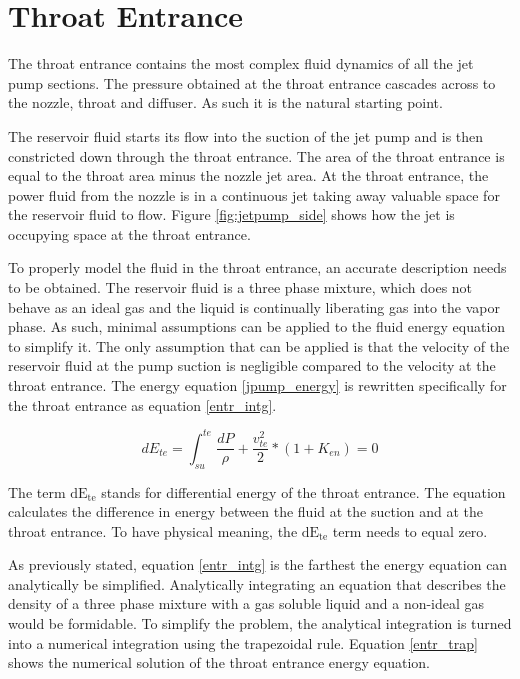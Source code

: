 \documentclass[12 pt]{report}
\newcommand{\dete}{$\mathrm{dE_{te}}$\xspace}  %
\begin{document}


\section{Throat Entrance}

The throat entrance contains the most complex fluid dynamics of all the jet pump sections. The pressure obtained at the throat entrance cascades across to the nozzle, throat and diffuser. As such it is the natural starting point.

The reservoir fluid starts its flow into the suction of the jet pump and is then constricted down through the throat entrance. The area of the throat entrance is equal to the throat area minus the nozzle jet area. At the throat entrance, the power fluid from the nozzle is in a continuous jet taking away valuable space for the reservoir fluid to flow. Figure \ref{fig:jetpump_side} shows how the jet is occupying space at the throat entrance.

To properly model the fluid in the throat entrance, an accurate description needs to be obtained. The reservoir fluid is a three phase mixture, which does not behave as an ideal gas and the liquid is continually liberating gas into the vapor phase. As such, minimal assumptions can be applied to the fluid energy equation to simplify it. The only assumption that can be applied is that the velocity of the reservoir fluid at the pump suction is negligible compared to the velocity at the throat entrance. The energy equation \eqref{jpump_energy} is rewritten specifically for the throat entrance as equation \eqref{entr_intg}.

\begin{equation}
dE_{te} = \int_{su}^{te} \frac{dP}{\rho} + \frac{v_{te}^{2}}{2} * (1+K_{en}) = 0
\label{entr_intg}
\end{equation}

The term \dete stands for differential energy of the throat entrance. The equation calculates the difference in energy between the fluid at the suction and at the throat entrance. To have physical meaning, the \dete term needs to equal zero.

As previously stated, equation \eqref{entr_intg} is the farthest the energy equation can analytically be simplified. Analytically integrating an equation that describes the density of a three phase mixture with a gas soluble liquid and a non-ideal gas would be formidable. To simplify the problem, the analytical integration is turned into a numerical integration using the trapezoidal rule. Equation \eqref{entr_trap} shows the numerical solution of the throat entrance energy equation.
\end{document}

